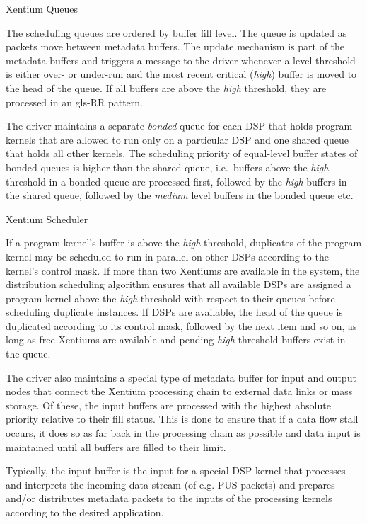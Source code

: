 %
{Xentium Queues}{%
The scheduling queues are ordered by buffer fill level. The queue is updated
as packets move between metadata buffers. The update mechanism is part of the
metadata buffers and triggers a message to the driver whenever a level threshold
is either over- or under-run and the most recent critical (\emph{high}) buffer is
moved to the head of the queue. If all buffers are above the \emph{high}
threshold, they are processed in an \gls{gls-RR} pattern. \newline

The driver maintains a separate \emph{bonded} queue for each \gls{DSP} that
holds program kernels that are allowed to run only on a particular \gls{DSP} and
one shared queue that holds all other kernels. The scheduling priority of
equal-level buffer states of bonded queues is higher than the shared queue,
i.e.\ buffers above the \emph{high} threshold in a bonded queue are processed
first, followed by the \emph{high} buffers in the shared queue, followed by the
\emph{medium} level buffers in the bonded queue etc.
}%
{}{}


%
{Xentium Scheduler}{%
If a program kernel's buffer is above the \emph{high} threshold, duplicates of
the program kernel may be scheduled to run in parallel on other \glspl{DSP}
according to the kernel's control mask. If more than two \glspl{Xentium} are
available in the system, the distribution scheduling algorithm ensures that 
all available \glspl{DSP} are assigned a program kernel above the \emph{high}
threshold with respect to their queues before scheduling duplicate instances.
If \glspl{DSP} are available, the head of the queue is duplicated according to
its control mask, followed by the next item and so on, as long as free
\glspl{Xentium} are available and pending \emph{high} threshold buffers exist
in the queue. \newline

The driver also maintains a special type of metadata buffer for input and output
nodes that connect the \gls{Xentium} processing chain to external data links
or mass storage. Of these, the input buffers are processed with the highest
absolute priority relative to their fill status. This is done to ensure that
if a data flow stall occurs, it does so as far back in the processing chain as
possible and data input is maintained until all buffers are filled to their
limit.
}%
{}{%
Typically, the input buffer is the input for a special \gls{DSP} kernel
that processes and interprets the incoming data stream (of e.g. \gls{PUS} 
packets) and prepares and/or distributes metadata packets to the inputs of the
processing kernels according to the desired application.
}



